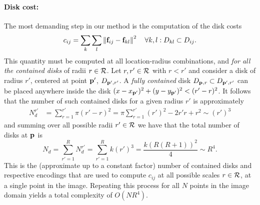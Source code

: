 \documentclass[10pt,twocolumn,letterpaper]{article}
\begin{document}
\paragraph{Disk cost:} The most demanding step in our method is the computation of the disk costs
\begin{equation}
c_{ij} = \sum_k \sum_l \left \lVert \mathbf{f}_{ij} - \mathbf{f}_{kl}  \right \rVert^2 \quad \forall k,l: D_{kl} \subset D_{ij}.
\label{eq:diskcost}
\end{equation}
This quantity must be computed at all location-radius combinations, and \emph{for all the contained disks} of radii $r\in\mathcal{R}$.
Let $r,r'\in\mathcal{R}$ with $r<r'$ and consider a disk of radius $r'$, centered at point $\mathbf{p}_{}'$, $D_{\mathbf{p}_{}',r'}$.
A \emph{fully contained} disk $D_{\mathbf{p}_{},r} \subset D_{\mathbf{p}_{}',r'}$ can be placed anywhere inside the disk
$(x-x_{\mathbf{p}_{}'})^2 + (y-y_{\mathbf{p}_{}'})^2 < (r'-r)^2$.
It follows that the number of such contained disks for a given radius $r'$ is approximately
\begin{align}
N_d^{r'} & = \sum_{r=1}^{r'}  \pi (r'-r)^2  = \pi \sum_{r=1}^{r'} (r')^2 -2r'r + r^2 \sim (r')^3
\label{eq:ndr}
\end{align}
and summing over all possible radii $r'\in\mathcal{R}$ we have that the total number of disks at $\mathbf{p}_{}$ is
\begin{equation}
N_d = \sum_{r'=1}^R N_d^{r'} = \sum_{r'=1}^R k (r')^3 = \frac{k(R(R+1))^2}{4} \sim R^4.
\label{eq:nd}
\end{equation}
This is the (approximate up to a constant factor) number of contained disks and respective encodings that are used to compute $c_{ij}$ at
all possible scales $r \in \mathcal{R}$, at a single point in the image.
Repeating this process for all $N$ points in the image domain yields a total complexity of $O(NR^4)$.
\end{document}
